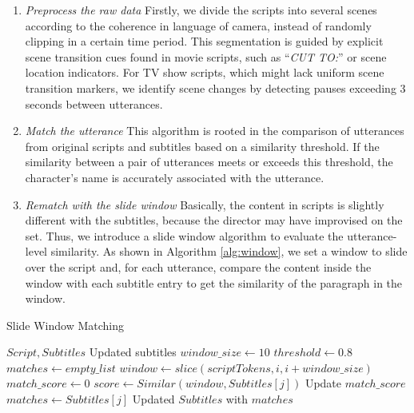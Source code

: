 \documentclass[letterpaper]{article} %
\begin{document}
\begin{enumerate}
      \item \textit{Preprocess the raw data} Firstly, we divide the scripts into several scenes according to the coherence in language of camera, instead of randomly clipping in a certain time period. This segmentation is guided by explicit scene transition cues found in movie scripts, such as ``\textit{CUT TO:}'' or scene location indicators. For TV show scripts, which might lack uniform scene transition markers, we identify scene changes by detecting pauses exceeding 3 seconds between utterances.
      \item \textit{Match the utterance} This algorithm is rooted in the comparison of utterances from original scripts and subtitles based on a similarity threshold. If the similarity between a pair of utterances meets or exceeds this threshold, the character's name is accurately associated with the utterance.
      \item \textit{Rematch with the slide window} Basically, the content in scripts is slightly different with the subtitles, because the director may have improvised on the set. Thus, we introduce a slide window algorithm to evaluate the utterance-level similarity. As shown in Algorithm \ref{alg:window}, we set a window to slide over the script and, for each utterance, compare the content inside the window with each subtitle entry to get the similarity of the paragraph in the window. 
\end{enumerate}

\begin{algorithm}[h]
	\caption{Slide Window Matching}
	\small
	\label{alg:window}
	\renewcommand{\algorithmicrequire}{\textbf{Input:}}
	\renewcommand{\algorithmicensure}{\textbf{Output:}}
	
	\begin{algorithmic}[1]
		\REQUIRE $Script, Subtitles$
		\ENSURE Updated subtitles 
		\STATE $window\_size \gets 10$
		\STATE $threshold \gets 0.8$
		\STATE $matches \gets empty\_list$
		\STATE $window \gets slice(scriptTokens, i, i + window\_size)$
		\STATE $match\_score \gets 0$
		\STATE $score \gets Similar(window, Subtitles[j])$
		\STATE Update $match\_score$
		\ENDIF
		\ENDFOR
		\STATE $matches \gets Subtitles[j]$
		\ENDIF
		\ENDFOR
		\RETURN Updated $Subtitles$ with $matches$
	\end{algorithmic}
\end{algorithm}

\end{document}

